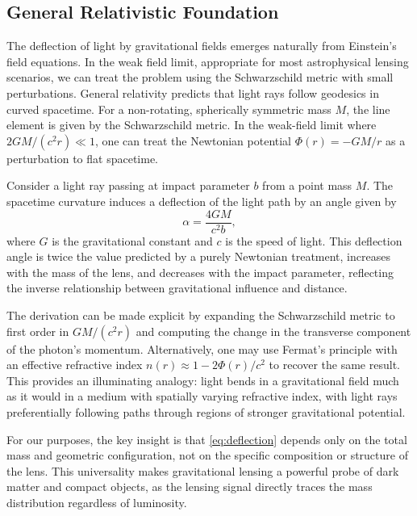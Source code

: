 \subsection{General Relativistic Foundation}
\label{sec:gr_foundation}

The deflection of light by gravitational fields emerges naturally from Einstein's field equations. In the weak field limit, appropriate for most astrophysical lensing scenarios, we can treat the problem using the Schwarzschild metric with small perturbations. General relativity predicts that light rays follow geodesics in curved spacetime. For a non-rotating, spherically symmetric mass $M$, the line element is given by the Schwarzschild metric. In the weak-field limit where $2GM/(c^2 r) \ll 1$, one can treat the Newtonian potential $\Phi(r) = -GM/r$ as a perturbation to flat spacetime.

Consider a light ray passing at impact parameter $b$ from a point mass $M$. The spacetime curvature induces a deflection of the light path by an angle given by
\begin{equation}
  \alpha = \frac{4 G M}{c^2 b},
  \label{eq:deflection}
\end{equation}
where $G$ is the gravitational constant and $c$ is the speed of light. This deflection angle is twice the value predicted by a purely Newtonian treatment, increases with the mass of the lens, and decreases with the impact parameter, reflecting the inverse relationship between gravitational influence and distance.

The derivation can be made explicit by expanding the Schwarzschild metric to first order in $GM/(c^2 r)$ and computing the change in the transverse component of the photon's momentum. Alternatively, one may use Fermat's principle with an effective refractive index $n(r) \approx 1 - 2\Phi(r)/c^2$ to recover the same result. This provides an illuminating analogy: light bends in a gravitational field much as it would in a medium with spatially varying refractive index, with light rays preferentially following paths through regions of stronger gravitational potential.

For our purposes, the key insight is that \cref{eq:deflection} depends only on the total mass and geometric configuration, not on the specific composition or structure of the lens. This universality makes gravitational lensing a powerful probe of dark matter and compact objects, as the lensing signal directly traces the mass distribution regardless of luminosity.

